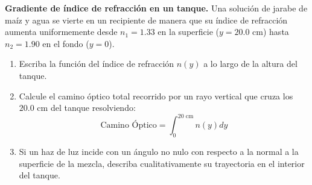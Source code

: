 \item \textbf{Gradiente de índice de refracción en un tanque.}
Una solución de jarabe de maíz y agua se vierte en un recipiente de manera que su índice de refracción aumenta uniformemente desde $n_1 = 1.33$ en la superficie ($y = 20.0\text{ cm}$) hasta $n_2 = 1.90$ en el fondo ($y = 0$).
\begin{enumerate}
    \item Escriba la función del índice de refracción $n(y)$ a lo largo de la altura del tanque.
    \item Calcule el camino óptico total recorrido por un rayo vertical que cruza los $20.0\text{ cm}$ del tanque resolviendo:
    $$ \text{Camino Óptico} = \int_0^{20\text{ cm}} n(y) dy $$
    \item Si un haz de luz incide con un ángulo no nulo con respecto a la normal a la superficie de la mezcla, describa cualitativamente su trayectoria en el interior del tanque.
\end{enumerate}